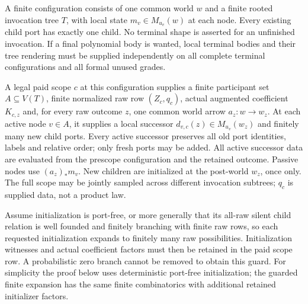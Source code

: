 \documentclass[11pt]{article}
\begin{document}
A finite configuration consists of one common world $w$ and a finite rooted invocation tree $T$, with local state $m_v\in M_{u_v}(w)$ at each node. Every existing child port has exactly one child. No terminal shape is asserted for an unfinished invocation. If a final polynomial body is wanted, local terminal bodies and their tree rendering must be supplied independently on all complete terminal configurations and all formal unused grades.

A legal paid scope $c$ at this configuration supplies a finite participant set $A\subseteq V(T)$, finite normalized raw row $(Z_c,q_c)$, actual augmented coefficient $K_{c,z}$ and, for every raw outcome $z$, one common world arrow $a_z:w\to w_z$. At each active node $v\in A$, it supplies a local successor $d_{v,c}(z)\in M_{u_v}(w_z)$ and finitely many new child ports. Every active successor preserves all old port identities, labels and relative order; only fresh ports may be added. All active successor data are evaluated from the prescope configuration and the retained outcome. Passive nodes use $(a_z)_*m_v$. New children are initialized at the post-world $w_z$, once only. The full scope may be jointly sampled across different invocation subtrees; $q_c$ is supplied data, not a product law.

Assume initialization is port-free, or more generally that its all-raw silent child relation is well founded and finitely branching with finite raw rows, so each requested initialization expands to finitely many raw possibilities. Initialization witnesses and actual coefficient factors must then be retained in the paid scope row. A probabilistic zero branch cannot be removed to obtain this guard. For simplicity the proof below uses deterministic port-free initialization; the guarded finite expansion has the same finite combinatorics with additional retained initializer factors.
\end{document}
